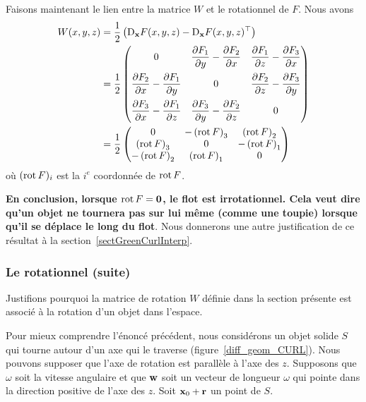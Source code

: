 {Faisons maintenant le lien entre la matrice $W$ et le rotationnel de
$F$.  Nous avons
\begin{align*}
W(x,y,z)
&= \frac{1}{2}
\left( \mathrm{D}_{\mathbf{x}} F(x,y,z) -
\mathrm{D}_{\mathbf{x}} F(x,y,z)^\top \right) \\
&= \frac{1}{2}
\begin{pmatrix}
0 & \displaystyle \frac{\partial F_1}{\partial y} - \frac{\partial F_2}{\partial x} &
\displaystyle \frac{\partial F_1}{\partial z} - \frac{\partial F_3}{\partial x} \\[1em]
\displaystyle \frac{\partial F_2}{\partial x} - \frac{\partial F_1}{\partial y} & 0 &
\displaystyle \frac{\partial F_2}{\partial z} - \frac{\partial F_3}{\partial y} \\[1em]
\displaystyle \frac{\partial F_3}{\partial x} - \frac{\partial F_1}{\partial z} &
\displaystyle \frac{\partial F_3}{\partial y} - \frac{\partial F_2}{\partial z} & 0
\end{pmatrix} \\
&= \frac{1}{2}
\begin{pmatrix}
0 & \displaystyle -\left(\operatorname{rot} F\right)_3 &
\displaystyle \left(\operatorname{rot} F\right)_2 \\
\displaystyle \left(\operatorname{rot} F\right)_3 & 0 &
\displaystyle -\left(\operatorname{rot} F\right)_1 \\
\displaystyle -\left(\operatorname{rot} F\right)_2 & 
\displaystyle \left(\operatorname{rot} F\right)_1 & 0
\end{pmatrix}
\end{align*}
où $(\operatorname{rot} F)_i$ est la $i^e$ coordonnée de
$\operatorname{rot} F$.

{\bfseries En conclusion, lorsque
$\operatorname{rot} F = \mathbf{0}$, le flot est irrotationnel.  Cela veut dire
qu'un objet ne tournera pas sur lui même (comme une toupie) lorsque
qu'il se déplace le long du flot}.  Nous donnerons une autre justification
de ce résultat à la section~\ref{sectGreenCurlInterp}.

\subsubsection{Le rotationnel (suite)}

Justifions pourquoi la matrice de rotation $W$ définie dans la section
présente est associé à la rotation d'un objet dans l'espace.

Pour mieux comprendre l'énoncé précédent, nous considérons un objet
solide $S$ qui tourne autour d'un axe qui le traverse
(figure~\ref{diff_geom_CURL}).  Nous pouvons supposer que
l'axe de rotation est parallèle à l'axe des $z$.  Supposons que
$\omega$ soit la vitesse angulaire et que $\mathbf{w}$ soit un vecteur de
longueur $\omega$ qui pointe dans la direction positive de l'axe des
$z$.   Soit $\mathbf{x}_0 + \mathbf{r}$ un point de $S$.

}

